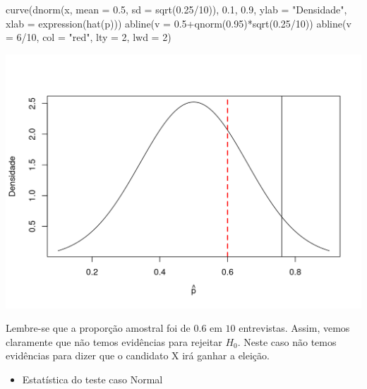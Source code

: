 \documentclass[
  10pt,
  a4paper]{book}
\newenvironment{Shaded}{\begin{snugshade}}{\end{snugshade}}
\newcommand{\AttributeTok}[1]{\textcolor[rgb]{0.77,0.63,0.00}{#1}}
\newcommand{\DecValTok}[1]{\textcolor[rgb]{0.00,0.00,0.81}{#1}}
\newcommand{\FloatTok}[1]{\textcolor[rgb]{0.00,0.00,0.81}{#1}}
\newcommand{\FunctionTok}[1]{\textcolor[rgb]{0.00,0.00,0.00}{#1}}
\newcommand{\NormalTok}[1]{#1}
\newcommand{\SpecialCharTok}[1]{\textcolor[rgb]{0.00,0.00,0.00}{#1}}
\newcommand{\StringTok}[1]{\textcolor[rgb]{0.31,0.60,0.02}{#1}}
\providecommand{\tightlist}{%
  \setlength{\itemsep}{0pt}\setlength{\parskip}{0pt}}
\begin{document}
\begin{Shaded}
\begin{Highlighting}[]
\FunctionTok{curve}\NormalTok{(}\FunctionTok{dnorm}\NormalTok{(x, }\AttributeTok{mean =} \FloatTok{0.5}\NormalTok{, }\AttributeTok{sd =} \FunctionTok{sqrt}\NormalTok{(}\FloatTok{0.25}\SpecialCharTok{/}\DecValTok{10}\NormalTok{)), }\FloatTok{0.1}\NormalTok{, }\FloatTok{0.9}\NormalTok{, }
      \AttributeTok{ylab =} \StringTok{"Densidade"}\NormalTok{, }\AttributeTok{xlab =} \FunctionTok{expression}\NormalTok{(}\FunctionTok{hat}\NormalTok{(p)))}
\FunctionTok{abline}\NormalTok{(}\AttributeTok{v =} \FloatTok{0.5}\SpecialCharTok{+}\FunctionTok{qnorm}\NormalTok{(}\FloatTok{0.95}\NormalTok{)}\SpecialCharTok{*}\FunctionTok{sqrt}\NormalTok{(}\FloatTok{0.25}\SpecialCharTok{/}\DecValTok{10}\NormalTok{))}
\FunctionTok{abline}\NormalTok{(}\AttributeTok{v =} \DecValTok{6}\SpecialCharTok{/}\DecValTok{10}\NormalTok{, }\AttributeTok{col =} \StringTok{"red"}\NormalTok{, }\AttributeTok{lty =} \DecValTok{2}\NormalTok{, }\AttributeTok{lwd =} \DecValTok{2}\NormalTok{)}
\end{Highlighting}
\end{Shaded}

\begin{center}\includegraphics{figures/unnamed-chunk-392-1} \end{center}

Lembre-se que a proporção amostral foi de \(0.6\) em \(10\) entrevistas.
Assim, vemos claramente que não temos evidências para rejeitar \(H_0\).
Neste caso não temos evidências para dizer que o candidato X irá ganhar a eleição.

\begin{itemize}
\tightlist
\item
  Estatística do teste caso Normal
\end{itemize}
\end{document}
